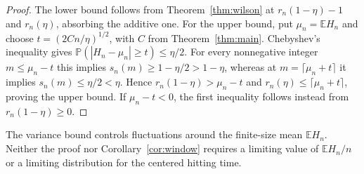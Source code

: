 \documentclass[11pt]{article}
\theoremstyle{remark}
\newcommand{\Prb}{\mathbb P}
\newcommand{\E}{\mathbb E}
\numberwithin{equation}{section}
\begin{document}
\begin{proof}
The lower bound follows from Theorem~\ref{thm:wilson} at
$r_n(1-\eta)-1$ and $r_n(\eta)$, absorbing the additive one.
For the upper bound, put $\mu_n=\E H_n$ and choose
$t=(2Cn/\eta)^{1/2}$, with $C$ from Theorem~\ref{thm:main}.
Chebyshev's inequality gives
$\Prb(|H_n-\mu_n|\ge t)\le\eta/2$.
For every nonnegative integer $m\le\mu_n-t$ this implies
$s_n(m)\ge1-\eta/2>1-\eta$, whereas at
$m=\lceil\mu_n+t\rceil$ it implies $s_n(m)\le\eta/2<\eta$.
Hence $r_n(1-\eta)>\mu_n-t$ and
$r_n(\eta)\le\lceil\mu_n+t\rceil$, proving the upper bound.
If $\mu_n-t<0$, the first inequality follows instead from
$r_n(1-\eta)\ge0$.
\end{proof}

The variance bound controls fluctuations around the finite-size mean
$\E H_n$. Neither the proof nor Corollary~\ref{cor:window} requires a
limiting value of $\E H_n/n$ or a limiting distribution for the
centered hitting time.



\end{document}

